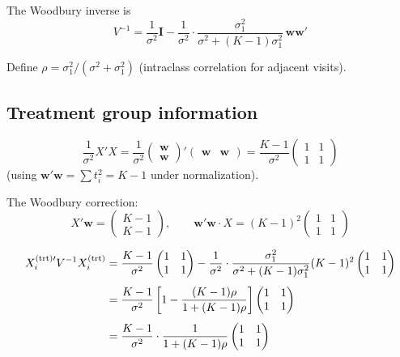 \documentclass[11pt]{article}
\newcommand{\bI}{\mathbf{I}}
\newcommand{\bw}{\mathbf{w}}
\begin{document}
The Woodbury inverse is
\begin{equation}
  V^{-1} = \frac{1}{\sigma^2}\bI
    - \frac{1}{\sigma^2}\cdot
    \frac{\sigma_1^2}{\sigma^2 + (K-1)\sigma_1^2}\,
    \bw\bw'
\end{equation}

Define $\rho = \sigma_1^2 / (\sigma^2 + \sigma_1^2)$
(intraclass correlation for adjacent visits).


\subsection{Treatment group information}

\begin{equation}
  \frac{1}{\sigma^2} X'X
  = \frac{1}{\sigma^2}\begin{pmatrix}\bw\\\bw\end{pmatrix}'
    \begin{pmatrix}\bw & \bw\end{pmatrix}
  = \frac{K-1}{\sigma^2}
    \begin{pmatrix} 1 & 1 \\ 1 & 1 \end{pmatrix}
\end{equation}
(using $\bw'\bw = \sum t_i^2 = K - 1$ under
normalization).

The Woodbury correction:
\begin{equation}
  X'\bw = \begin{pmatrix} K-1 \\ K-1 \end{pmatrix},
  \qquad
  \bw'\bw \cdot X = (K-1)^2
    \begin{pmatrix} 1 & 1 \\ 1 & 1 \end{pmatrix}
\end{equation}

\begin{align}
  X_i^{(\text{trt})\prime} V^{-1} X_i^{(\text{trt})}
  &= \frac{K-1}{\sigma^2}
    \begin{pmatrix}1&1\\1&1\end{pmatrix}
    - \frac{1}{\sigma^2}\cdot
    \frac{\sigma_1^2}{\sigma^2 + (K-1)\sigma_1^2}
    (K-1)^2
    \begin{pmatrix}1&1\\1&1\end{pmatrix}
    \notag \\[4pt]
  &= \frac{K-1}{\sigma^2}\left[
    1 - \frac{(K-1)\rho}{1 + (K-1)\rho}
  \right]
  \begin{pmatrix}1&1\\1&1\end{pmatrix}
    \notag \\[4pt]
  &= \frac{K-1}{\sigma^2}\cdot
    \frac{1}{1 + (K-1)\rho}
    \begin{pmatrix}1&1\\1&1\end{pmatrix}
\end{align}
\end{document}
